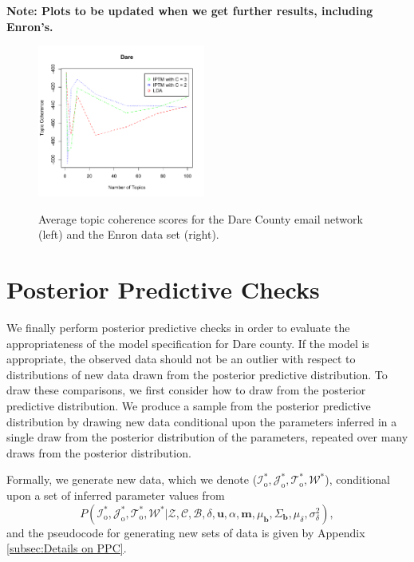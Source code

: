 \documentclass[a4paper]{article}
\begin{document}
\textbf{Note: Plots to be updated when we get further results, including Enron's.}
\begin{figure}[ht]
	\centering
	\includegraphics[width=0.49\textwidth]{plots/Dare_topic.pdf}  
	\label{fig:Daretopic}
	\caption{Average topic coherence scores for the Dare County email network (left) and the Enron data set (right).}
\end{figure}


\section{Posterior Predictive Checks}

We finally perform posterior predictive checks \cite{rubin1984bayesianly} in order to evaluate the appropriateness of the model specification for Dare county. If the model is appropriate, the observed data should not be an outlier with respect to distributions of new data drawn from the posterior predictive distribution. To draw these comparisons, we first consider how to draw from the posterior predictive distribution. We produce a sample from the posterior predictive distribution by drawing new data conditional upon the parameters inferred in a single draw from the posterior distribution of the parameters, repeated over many draws from the posterior distribution. 

Formally, we generate new data, which we denote ($\mathcal{I}_{\mbox{o}}^*, \mathcal{J}_{\mbox{o}}^*, \mathcal{T}_{\mbox{o}}^*,\mathcal{W}^*$), conditional upon a set of inferred parameter values from
\begin{equation}
P(\mathcal{I}_{\mbox{o}}^*, \mathcal{J}_{\mbox{o}}^*, \mathcal{T}_{\mbox{o}}^*,\mathcal{W}^* |\mathcal{Z}, \mathcal{C}, \mathcal{B}, \delta,\boldsymbol{u}, \alpha, \boldsymbol{m}, \mu_{\boldsymbol{b}}, \Sigma_{\boldsymbol{b}}, \mu_\delta, \sigma^2_\delta),
\label{eqn:backwardssample}
\end{equation}
and the pseudocode for generating new sets of data is given by Appendix \ref{subsec:Details on PPC}.
\end{document}
